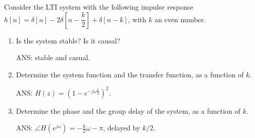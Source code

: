 \begin{q}{}
Consider the LTI system with the following impulse response $h[n]=\delta[n]-2\delta[n-\dfrac{k}{2}]+\delta[n-k]$, with $k$ an even number.
\begin{enumerate}[label=(\alph*)]
    \item Is the system stable? Is it causal? 
    \begin{flushright}
    \begin{blueenv}
        ANS: stable and casual.
    \end{blueenv}
    \end{flushright}
    
    \item Determine the system function and the transfer function, as a function of $k$.
    \begin{flushright}
    \begin{blueenv}
        ANS: $H(z) = ( 1 - e^{-j\omega \frac{k}{2}} )^2$.
    \end{blueenv}
    \end{flushright}
    
    \item Determine the phase and the group delay of the system, as a function of $k$.
    \begin{flushright}
    \begin{blueenv}
        ANS: $\angle H(e^{j\omega}) = -\frac{k}{2} \omega - \pi$, delayed by $k/2$.
    \end{blueenv}
    \end{flushright}
\end{enumerate}
    
    

\end{q}
